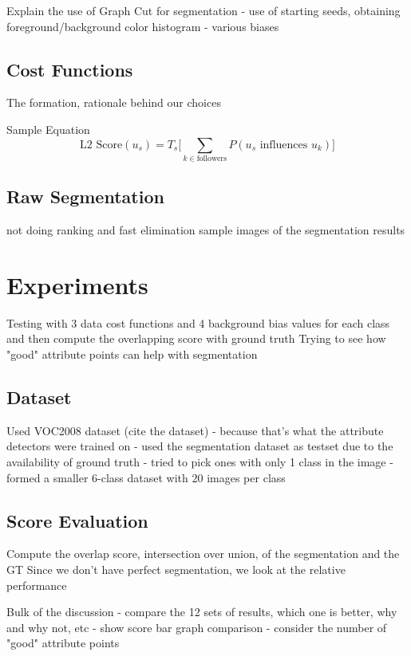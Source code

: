 \documentclass[10pt,twocolumn,letterpaper]{article}
\begin{document}
Explain the use of Graph Cut for segmentation
- use of starting seeds, obtaining foreground/background color histogram
- various biases


\subsection{Cost Functions}

The formation, rationale behind our choices

Sample Equation
\[
\textrm{L2 Score} (u_s) = T_s\bigg[ \sum_{k \in \textrm{followers}}{P(\textrm{$u_s$ influences $u_k$})} \bigg]
\]


\subsection{Raw Segmentation}

not doing ranking and fast elimination
sample images of the segmentation results


\section{Experiments}

Testing with 3 data cost functions and 4 background bias values for each class and then compute the overlapping score with ground truth
Trying to see how "good" attribute points can help with segmentation


\subsection{Dataset}

Used VOC2008 dataset (cite the dataset)
- because that's what the attribute detectors were trained on
- used the segmentation dataset as testset due to the availability of ground truth
- tried to pick ones with only 1 class in the image
- formed a smaller 6-class dataset with 20 images per class


\subsection{Score Evaluation}

Compute the overlap score, intersection over union, of the segmentation and the GT
Since we don't have perfect segmentation, we look at the relative performance

Bulk of the discussion
- compare the 12 sets of results, which one is better, why and why not, etc
- show score bar graph comparison
- consider the number of "good" attribute points
\end{document}
